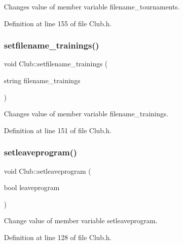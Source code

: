 Changes value of member variable filename\+\_\+tournaments. 



Definition at line 155 of file Club.\+h.

\hypertarget{class_club_af1693f8321d273f68b3bcfebff5d4ac9}{}\label{class_club_af1693f8321d273f68b3bcfebff5d4ac9} 
\subsubsection{\texorpdfstring{setfilename\+\_\+trainings()}{setfilename\_trainings()}}
{\footnotesize\ttfamily void Club\+::setfilename\+\_\+trainings (\begin{DoxyParamCaption}\item[{string}]{filename\+\_\+trainings }\end{DoxyParamCaption})\hspace{0.3cm}{\ttfamily [inline]}}



Changes value of member variable filename\+\_\+trainings. 



Definition at line 151 of file Club.\+h.

\hypertarget{class_club_a797110a5f4b779fec91a6fecbc0e3dda}{}\label{class_club_a797110a5f4b779fec91a6fecbc0e3dda} 
\subsubsection{\texorpdfstring{setleaveprogram()}{setleaveprogram()}}
{\footnotesize\ttfamily void Club\+::setleaveprogram (\begin{DoxyParamCaption}\item[{bool}]{leaveprogram }\end{DoxyParamCaption})\hspace{0.3cm}{\ttfamily [inline]}}



Change value of member variable setleaveprogram. 



Definition at line 128 of file Club.\+h.

\hypertarget{class_club_a7ef23c55751610bc2cb98a356a6bee46}{}\label{class_club_a7ef23c55751610bc2cb98a356a6bee46} 

